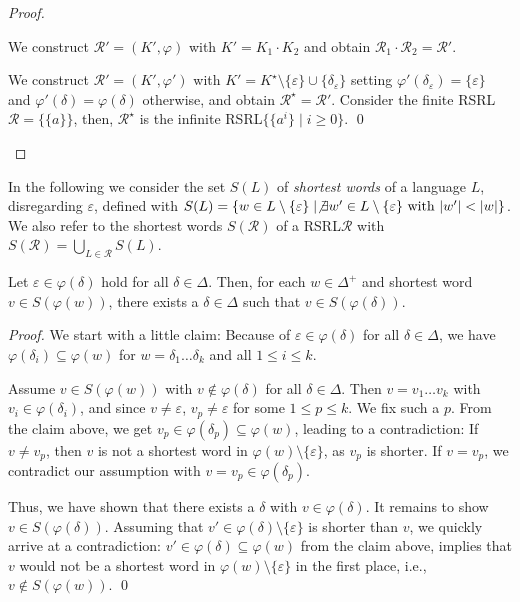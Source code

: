 \documentclass[envcountsame]{llncs}
\newcommand{\rationalset}{\ensuremath{\mathcal{R}}\xspace}
\newcommand{\RegularlyGeneratedLanguageSetAbbrev}{RSRL\xspace}
\begin{document}
\begin{proof}
  \begin{inparaenum}[\bfseries(1)]
  \item We construct $\rationalset' = (K', \varphi)$ with $K' = K_1
    \cdot K_2$ and obtain $\rationalset_1 \cdot \rationalset_2 =
    \rationalset'$.
  \item We construct $\rationalset' = (K', \varphi')$ with $K' =
    K^\star \setminus \{ \varepsilon \} \cup \{ \delta_\varepsilon \}$
    setting $\varphi'(\delta_\varepsilon) = \{ \varepsilon \}$ and
    $\varphi'(\delta) = \varphi(\delta)$ otherwise, and obtain
    $\rationalset^\star=\rationalset'$.
Consider the finite \RegularlyGeneratedLanguageSetAbbrev $\rationalset = \{ \{ a \} \}$,
    then, $\rationalset^\star$ is the infinite \RegularlyGeneratedLanguageSetAbbrev $\{ \{ a^i
    \} \mid i \geq 0 \}$.
\qed
  \end{inparaenum}
\end{proof}

In the following we consider the set $S(L)$ of \emph{shortest words}
of a language $L$, disregarding $\varepsilon$, defined with
$S(L)=\{w\in L\setminus\{\varepsilon\} \mid \not\exists w'\in
L\setminus\{\varepsilon\} \mbox{ with } |w'|<|w|\}$.
We also refer to the shortest words $S(\rationalset)$ of a \RegularlyGeneratedLanguageSetAbbrev $\rationalset$ with
$S(\rationalset)=\bigcup_{L\in\rationalset}S(L)$. 

\begin{lemma}
  \label{lemma:minimal-words}
  Let $\varepsilon \in \varphi(\delta)$ hold for all $\delta \in
  \Delta$.
Then, for each $w \in \Delta^+$ and shortest word $v\in
  S(\varphi(w))$, there exists a $\delta\in\Delta$ such that $v\in
  S(\varphi(\delta))$.
\end{lemma}

\begin{proof}
  We start with a little claim: 
Because of $\varepsilon\in\varphi(\delta)$ for all
  $\delta\in\Delta$, we have $\varphi(\delta_i)\subseteq \varphi(w)$
  for $w=\delta_1\dots \delta_k$ and all $1\le i \le k$.


  Assume $v\in S(\varphi(w))$ with $v\not\in\varphi(\delta)$ for all
  $\delta\in\Delta$.
Then $v=v_1\dots v_k$ with $v_i\in\varphi(\delta_i)$, and since
  $v\neq \varepsilon$, $v_p\neq\varepsilon$ for some $1\le p\le k$. We
  fix such a $p$.
From the claim above, we get $v_p\in\varphi(\delta_p)\subseteq
  \varphi(w)$, leading to a contradiction:
If $v\neq v_p$, then $v$ is not a shortest word in
  $\varphi(w)\setminus\{\varepsilon\}$, as $v_p$ is shorter. 
If $v=v_p$, we contradict our assumption with
  $v=v_p\in\varphi(\delta_p)$.  


  Thus, we have shown that there exists a $\delta$ with
  $v\in\varphi(\delta)$.
It remains to show $v\in S(\varphi(\delta))$.
Assuming that $v'\in\varphi(\delta)\setminus\{\varepsilon\}$ is
  shorter than $v$, we quickly arrive at a contradiction:
$v'\in\varphi(\delta)\subseteq \varphi(w)$ from the claim above,
  implies that $v$ would not be a shortest word in
  $\varphi(w)\setminus\{\varepsilon\}$ in the first place, i.e.,
  $v\not\in S(\varphi(w))$. 
\qed
\end{proof}
\end{document}
